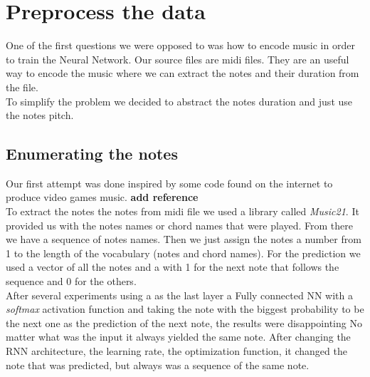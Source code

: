 \documentclass[11pt]
{article}
\begin{document}


\section{Preprocess the data}
One of the first questions we were opposed to was how to encode music in order to train the Neural Network. Our source files are midi files. They are an useful way to encode the music where we can extract the notes and their duration from the file.\\
To simplify the problem we decided to abstract the notes duration and just use the notes pitch. \\

\subsection{Enumerating the notes}
Our first attempt was done inspired by some code found on the internet to produce video games music. \textbf{add reference}\\
To extract the notes the notes from midi file we used a library called \textit{Music21}. It provided us with the notes names or chord names that were played. From there we have a sequence of notes names. Then we just assign the notes a number from 1 to the length of the vocabulary (notes and chord names).
For the prediction we used a vector of all the notes and a with 1 for the next note that follows the sequence and 0 for the others.\\
After several experiments using a as the last layer a Fully connected NN with a \textit{softmax} activation function and taking the note with the biggest probability to be the next one as the prediction of the next note, the results were disappointing
 No matter what was the input it always yielded the same note. After changing the RNN architecture, the learning rate, the optimization function, it changed the note that was predicted, but always was a sequence of the same  note.
\end{document}
